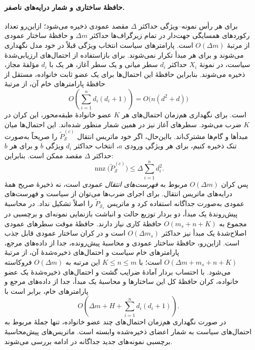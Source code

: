 \paragraph{حافظهٔ ساختاری و شمار درایه‌های ناصفر.}
برای هر رأس نمونه--ویژگی حداکثر
$\Delta$ مقصد عمودی ذخیره می‌شود؛
ازاین‌رو تعداد رکوردهای همسایگی
جهت‌دار در تمام زیرگراف‌ها حداکثر
$\Delta m$ و حافظهٔ ساختار عمودی
از مرتبهٔ $O(\Delta m)$ است.
پارامترهای سیاست انتخاب ویژگی
قبلاً در خود مدل نگهداری می‌شوند
و برای هر مبدأ تکرار نمی‌شوند.
برای بازاستفاده از احتمال‌های ارزیابی‌شدهٔ سیاست،
در نمونهٔ $X_i$ حداکثر $d_i$ سطر میانی و یک سطر
آغاز، هر یک با $d_i$ مؤلفهٔ مجاز، ذخیره می‌شوند.
بنابراین حافظهٔ این احتمال‌ها برای یک عضو ثابت
خانواده، مستقل از حافظهٔ پارامترهای خام آن، از مرتبهٔ
\[
O\left(\sum_{i=1}^{n}d_i(d_i+1)\right)
=O\bigl(n(d^2+d)\bigr)
\]
است. برای نگهداری هم‌زمان احتمال‌های هر $K$ عضو
خانوادهٔ طبقه‌محور، این کران در $K$ ضرب می‌شود.
سطرهای آغاز نیز در همین شمار منظور شده‌اند.
این احتمال‌ها میان مبدأها و گام‌ها مشترک‌اند.
بااین‌حال، اگر خود ماتریس انتقال
$\widetilde P_{\mathcal S}^{(c)}$
را صریحاً به‌صورت تنک ذخیره کنیم،
برای هر ویژگی ورودی $a$، انتخاب
حداکثر $d_i$ ویژگی $b$ و برای هر
$b$ حداکثر $\Delta$ مقصد ممکن است.
بنابراین:
\begin{equation}\label{cmp:eq:ch3-sparse-nnz}
\boxed{
\operatorname{nnz}
\bigl(\widetilde P_{\mathcal S}^{(c)}\bigr)
\le\Delta\sum_{i=1}^{n}d_i^2.
}
\end{equation}
پس کران $O(\Delta m)$ مربوط به
\emph{فهرست‌های انتقال عمودی} است،
نه ذخیرهٔ صریح همهٔ درایه‌های
ماتریس انتقال. برای اجرای ضرب‌ها
می‌توان از سیاست و فهرست‌های
عمودی به‌صورت جداگانه استفاده کرد
و ماتریس $\widetilde P_{\mathcal S_s}$
را اصلاً تشکیل نداد.
در محاسبهٔ پیش‌روندهٔ یک مبدأ،
دو بردار توزیع حالت و انباشت
بازنمایی نمونه‌ای و برچسبی
در مجموع به $O(m_s+n+K)$
حافظهٔ کاری نیاز دارند. حافظهٔ موقت سطرهای
عمودی اصلاح‌شدهٔ یک مبدأ نیز حداکثر
$O(\Delta m_s)$ است و در کران ساختار عمودی
قابل جذب است. ازاین‌رو،
حافظهٔ ساختار عمودی و محاسبهٔ
پیش‌رونده، جدا از داده‌های مرجع،
پارامترهای خام سیاست و احتمال‌های ذخیره‌شدهٔ آن،
از مرتبهٔ $O(\Delta m+m_s+n+K)$ است؛
با $K\le n\le m$ این مرتبه
به $O(\Delta m)$ فروکاسته می‌شود.
با احتساب بردار آمادهٔ ضرایب گشت و احتمال‌های
ذخیره‌شدهٔ یک عضو خانواده، کران حافظهٔ کل
این ساختارها و محاسبهٔ یک مبدأ، جدا از داده‌های
مرجع و پارامترهای خام، برابر است با
\[
O\left(\Delta m+H+\sum_{i=1}^{n}d_i(d_i+1)\right).
\]
در صورت نگهداری هم‌زمان احتمال‌های چند عضو خانواده،
تنها جملهٔ مربوط به احتمال‌های سیاست به شمار
اعضای ذخیره‌شده وابسته است.
ماتریس‌های پیش‌محاسبهٔ برچسبی نمونه‌های جدید
جداگانه در ادامه بررسی می‌شوند.

